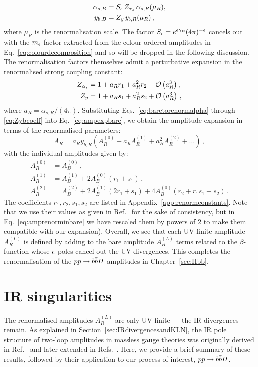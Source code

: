 \documentclass[main.tex]{subfiles}
\begin{document}
\begin{align}
    \alpha_{s,B} &= S_\epsilon\, Z_{\alpha_s} \, \alpha_{s,R}(\mu_R), \label{eq:baretorenormalpha} \\
    y_{b,B} &= Z_y \, y_{b,R}(\mu_R) \label{eq:baretorenormyb} \,,
\end{align}
where $\mu_R$ is the renormalisation scale. The factor $S_\epsilon = e^{\epsilon \gamma_E} (4\pi)^{-\epsilon}$ cancels out with the $m_\epsilon$ factor extracted from the colour-ordered amplitudes in Eq.~\ref{eq:colourdecomposition} and so will be dropped in the following discussion. The renormalisation factors themselves admit a perturbative expansion in the renormalised strong coupling constant:
\begin{align}
    Z_{\alpha_s} &= 1 + a_R r_1 + a_R^2 r_2 + \mathcal{O}\left(a_R^3\right),  \label{eq:Zalphacoeff} \\
    Z_y &= 1 + a_R s_1 + a_R^2 s_2 + \mathcal{O}\left(a_R^3\right) \label{eq:Zybcoeff}\,,
\end{align}
where $a_R = \alpha_{s,R}/(4\pi)$. Substituting Eqs.~\ref{eq:baretorenormalpha} through \ref{eq:Zybcoeff} into Eq.~\ref{eq:ampexpbare}, we obtain the amplitude expansion in terms of the renormalised parameters:
\begin{equation} \label{eq:ampexprenorm}
    A_R = a_R y_{b,R} \left(A_R^{(0)} + a_R A_R^{(1)} + a_B^2 A_R^{(2)} + \ldots \right)\,,
\end{equation}
with the individual amplitudes given by:
\begin{align}
    A_R^{(0)} &= A_B^{(0)} \,,\nonumber \\ 
    A_R^{(1)} &= A_B^{(1)} + 2 A_B^{(0)}(r_1 + s_1) \,, \label{eq:amprenorminbare}\\ 
    A_R^{(2)} &= A_B^{(2)} + 2 A_B^{(1)}(2r_1 + s_1) + 4A_B^{(0)} (r_2 + r_1 s_1 + s_2)\,. \nonumber
\end{align}
The coefficients $r_1, r_2, s_1, s_2$ are listed in Appendix~\ref{app:renormconstants}. Note that we use their values as given in Ref.~\cite{Mondini:2019vub} for the sake of consistency, but in Eq.~\ref{eq:amprenorminbare} we have rescaled them by powers of 2 to make them compatible with our expansion). Overall, we see that each UV-finite amplitude $A_R^{(L)}$ is defined by adding to the bare amplitude $A_B^{(L)}$ terms related to the $\beta$-function whose $\epsilon$ poles cancel out the UV divergences. This completes the renormalisation of the $pp \rightarrow b\bar{b}H$ amplitudes in Chapter~\ref{sec:Hbb}.
\section{IR singularities}
The renormalised amplitudes $A_R^{(L)}$ are only UV-finite --- the IR divergences remain. As explained in Section~\ref{sec:IRdivergencesandKLN}, the IR pole structure of two-loop amplitudes in massless gauge theories was originally derived in Ref.~\cite{Catani:1998bh} and later extended in  Refs.~\cite{Becher:2009cu, Becher:2009qa, Gardi:2009qi}. Here, we provide a brief summary of these results, followed by their application to our process of interest, $pp \rightarrow b\bar{b}H$.
\end{document}
